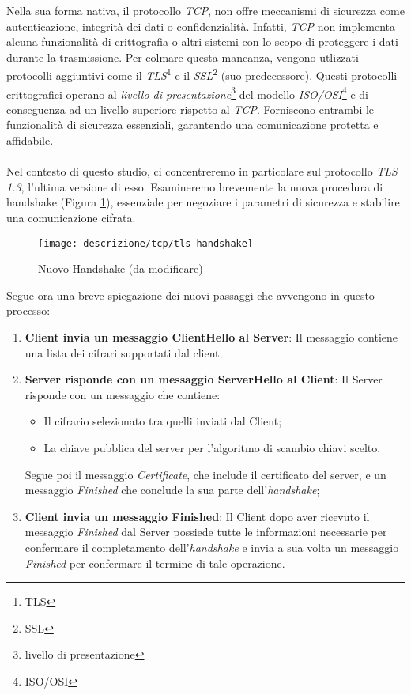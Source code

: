 \noindent Nella sua forma nativa, il protocollo \emph{TCP}, non offre meccanismi di sicurezza come autenticazione, integrità dei dati o confidenzialità. Infatti, \emph{TCP} non implementa alcuna funzionalità di crittografia o altri sistemi con lo scopo di proteggere i dati durante la trasmissione.
Per colmare questa mancanza, vengono utlizzati protocolli aggiuntivi come il \emph{TLS}\footnote{\gls{TLS}} e il \emph{SSL}\footnote{\gls{SSL}} (suo predecessore). Questi protocolli crittografici operano al \emph{livello di presentazione}\footnote{\gls{livello di presentazione}} del modello \emph{ISO/OSI}\footnote{\gls{ISO/OSI}} e di conseguenza ad un livello superiore rispetto al \emph{TCP}.
Forniscono entrambi le funzionalità di sicurezza essenziali, garantendo una comunicazione protetta e affidabile.
\\\\
Nel contesto di questo studio, ci concentreremo in particolare sul protocollo \emph{TLS 1.3}, l'ultima versione di esso. Esamineremo brevemente la nuova procedura di handshake (Figura \ref{tlsHand}), essenziale per negoziare i parametri di sicurezza e stabilire una comunicazione cifrata.
\begin{figure}[!h]
    \centering
    \texttt{[image: descrizione/tcp/tls-handshake]}
    \caption{Nuovo Handshake (da modificare)}
    \label{tlsHand}
\end{figure}

\noindent Segue ora una breve spiegazione dei nuovi passaggi che avvengono in questo processo:
\begin{enumerate}
    \item \textbf{Client invia un messaggio ClientHello al Server}: Il messaggio contiene una lista dei cifrari supportati dal client;
    \item \textbf{Server risponde con un messaggio ServerHello al Client}: Il Server risponde con un messaggio che contiene: 
    \begin{itemize}
        \item  Il cifrario selezionato tra quelli inviati dal Client;
        \item  La chiave pubblica del server per l'algoritmo di scambio chiavi scelto.
    \end{itemize}
    Segue poi il messaggio \emph{Certificate}, che include il certificato del server, e un messaggio \emph{Finished} che conclude la sua parte dell'\emph{handshake};
    \item \textbf{Client invia un messaggio Finished}: Il Client dopo aver ricevuto il messaggio \emph{Finished} dal Server possiede tutte le informazioni necessarie per confermare il completamento dell'\emph{handshake} e invia a sua volta un messaggio \emph{Finished} per confermare il termine di tale operazione.
\end{enumerate}


